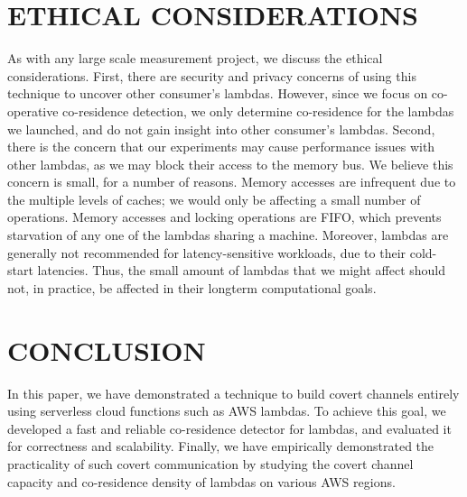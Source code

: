 
\section{ETHICAL CONSIDERATIONS}
As with any large scale measurement project, we discuss the ethical
considerations. First, there are security and privacy concerns of using this
technique to uncover other consumer's lambdas. However, since we focus on
co-operative co-residence detection, we only determine co-residence for the
lambdas we launched, and do not gain insight into other consumer's lambdas.
Second, there is the concern that our experiments may cause performance issues with
other lambdas, as we may block their access to the memory bus. We believe this
concern is small, for a number of reasons. Memory accesses are infrequent due to
the multiple levels of caches; we would only be affecting a small number of
operations. Memory accesses and locking operations are FIFO, which prevents
starvation of any one of the lambdas sharing a machine. Moreover, lambdas are
generally not recommended for latency-sensitive workloads, due to their
cold-start latencies. Thus, the small amount of lambdas that we might affect
should not, in practice, be affected in their longterm computational goals. 


\section{CONCLUSION}
\label{sec:conclusion}
In this paper, we have demonstrated a technique to build covert channels 
entirely using serverless cloud functions such as 
AWS lambdas. To achieve this goal, we developed a fast and reliable co-residence 
detector for lambdas, and evaluated it for correctness and scalability.
Finally, we have empirically demonstrated the practicality of such covert 
communication by studying the covert channel capacity and 
co-residence density of lambdas on various AWS regions.


